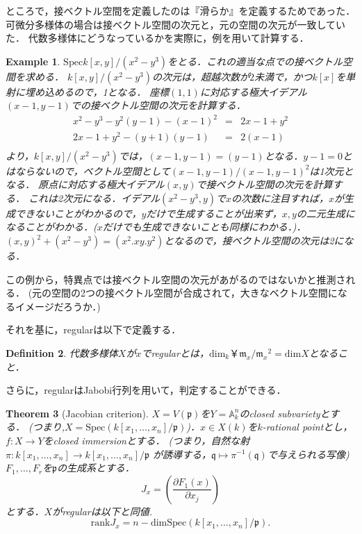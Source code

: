 \documentclass{ujarticle}
\newtheorem{thm}{Theorem}[section]
\newtheorem{dfn}[thm]{Definition}
\newtheorem{epl}[thm]{Example}
\begin{document}
ところで，接ベクトル空間を定義したのは『滑らか』を定義するためであった．
可微分多様体の場合は接ベクトル空間の次元と，元の空間の次元が一致していた．
代数多様体にどうなっているかを実際に，例を用いて計算する．
\begin{epl}
  $\mathrm{Spec}k[x,y]/(x^2 - y^3)$をとる．これの適当な点での接ベクトル空間を求める．
  $k[x,y]/(x^2 - y^3)$の次元は，超越次数が$2$未満で，かつ$k[x]$を単射に埋め込めるので，1となる．
  座標$(1,1)$に対応する極大イデアル$(x-1,y-1)$での接ベクトル空間の次元を計算する．
　\begin{eqnarray*}
　 x^2 - y^3 -y^2(y-1)  - (x-1)^2 & =  & 2x - 1 +y^2  \\
  2x - 1 +y^2- (y+1)(y-1) & = & 2(x -1)  \\
　\end{eqnarray*}
より，$k[x,y]/(x^2 - y^3)$では，$(x-1,y-1)=(y-1)$となる．$y-1 =0$とはならないので，ベクトル空間として$(x-1,y-1)/(x-1,y-1)^2$は1次元となる．
原点に対応する極大イデアル$(x,y)$で接ベクトル空間の次元を計算する．
これは2次元になる．イデアル$(x^2 - y^3 ,y)$で$x$の次数に注目すれば，$x$が生成できないことがわかるので，$y$だけで生成することが出来ず，$x,y$の二元生成になることがわかる．($x$だけでも生成できないことも同様にわかる．)．$(x,y)^2 +(x^2 - y^3)=(x^2.xy.y^2)$となるので，接ベクトル空間の次元は2になる．
\end{epl}

この例から，特異点では接ベクトル空間の次元があがるのではないかと推測される．
(元の空間の2つの接ベクトル空間が合成されて，大きなベクトル空間になるイメージだろうか．)


それを基に，regularは以下で定義する．
\begin{dfn}
 代数多様体$X$が$x$でregularとは，$\mathrm{dim}_k￥
 　\mathfrak{m}_x/{\mathfrak{m}_x}^2=\mathrm{dim}X$となること．
\end{dfn}

さらに，regularはJabobi行列を用いて，判定することができる．

\begin{thm}[Jacobian criterion]
  $X=V( \mathfrak{p})$を$Y=\mathbb{A}_k^n$のclosed subvarietyとする．
  (つまり,$X=\mathrm{Spec}(k[x_1,\dots,x_n]/\mathfrak{p})$)．$x \in X(k)$を$k$-rational pointとし，$f:X \to Y$をclosed immersionとする．
  (つまり，自然な射$\pi :k[x_1,\dots,x_n] \to k[x_1,\dots,x_n]/\mathfrak{p} $
  が誘導する，$\mathfrak{q} \mapsto \pi^{-1}(\mathfrak{q}) $で与えられる写像)
  $F_1,\dots,F_r$を$\mathfrak{p}$の生成系とする．
  \begin{equation*}
   J_x=(\frac{\partial F_1(x)}{\partial x_j})
  \end{equation*}
  とする．$X$がregularは以下と同値.
  \begin{equation*}
   \mathrm{rank}J_x=n- \mathrm{dim}
    \mathrm{Spec}(k[x_1,\dots,x_n]/\mathfrak{p}).
  \end{equation*}
\end{thm}
\end{document}
